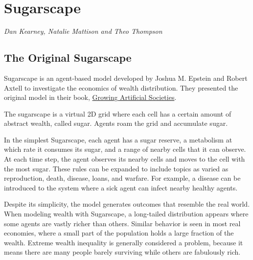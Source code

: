 \documentclass[10pt]{book}
\begin{document}


\appendix

\chapter{Sugarscape}

{\em Dan Kearney, Natalie Mattison and Theo Thompson}

\section{The Original Sugarscape}

Sugarscape is an agent-based model developed by Joshua M. Epstein and
Robert Axtell to investigate the economics of wealth distribution.
They presented the original model in their book,
\underline{Growing Artificial Societies}.

The sugarscape is a virtual 2D grid where each cell has a certain
amount of abstract wealth, called sugar.  Agents roam the grid
and accumulate sugar.

In the simplest Sugarscape, each agent has a sugar reserve, a
metabolism at which rate it consumes its sugar, and a range of nearby
cells that it can observe.  At each time step, the agent observes its
nearby cells and moves to the cell with the most sugar. These rules
can be expanded to include topics as varied as reproduction, death,
disease, loans, and warfare. For example, a disease can be introduced
to the system where a sick agent can infect nearby healthy agents.

Despite its simplicity, the model generates outcomes that resemble the
real world. When modeling wealth with Sugarscape, a long-tailed
distribution appears where some agents are vastly richer than others.
Similar behavior is seen in most real economies, where a small part of
the population holds a large fraction of the wealth.  Extreme wealth
inequality is generally considered a problem, because it means there
are many people barely surviving while others are fabulously rich.
\end{document}
